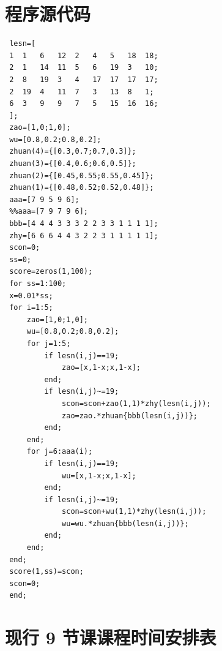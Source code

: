 \documentclass[a4paper]{article}
\def\baselinestretch{1.2}
\begin{document}
\clearpage



\nocite{*}
\clearpage

\begin{appendices}

\section{程序源代码}

 \renewcommand{\baselinestretch}{1}
 \hypertarget{program}{}
 \setlength{\marginparsep}{-470pt}

 \begin{lstlisting}
 lesn=[
 1	1	6	12	2	4	5	18	18;
 2	1	14	11	5	6	19	3	10;
 2	8	19	3	4	17	17	17	17;
 2	19	4	11	7	3	13	8	1;
 6	3	9	9	7	5	15	16	16;
 ];
 zao=[1,0;1,0];
 wu=[0.8,0.2;0.8,0.2];
 zhuan(4)={[0.3,0.7;0.7,0.3]};
 zhuan(3)={[0.4,0.6;0.6,0.5]};
 zhuan(2)={[0.45,0.55;0.55,0.45]};
 zhuan(1)={[0.48,0.52;0.52,0.48]};
 aaa=[7 9 5 9 6];
 %%aaa=[7 9 7 9 6];
 bbb=[4 4 4 3 3 3 2 2 3 3 1 1 1 1];
 zhy=[6 6 6 4 4 3 2 2 3 1 1 1 1 1];
 scon=0;
 ss=0;
 score=zeros(1,100);
 for ss=1:100;
 x=0.01*ss;
 for i=1:5;
     zao=[1,0;1,0];
     wu=[0.8,0.2;0.8,0.2];
     for j=1:5;
         if lesn(i,j)==19;
             zao=[x,1-x;x,1-x];
         end;
         if lesn(i,j)~=19;
             scon=scon+zao(1,1)*zhy(lesn(i,j));
             zao=zao.*zhuan{bbb(lesn(i,j))};
         end;
     end;
     for j=6:aaa(i);
         if lesn(i,j)==19;
             wu=[x,1-x;x,1-x];
         end;
         if lesn(i,j)~=19;
             scon=scon+wu(1,1)*zhy(lesn(i,j));
             wu=wu.*zhuan{bbb(lesn(i,j))};
         end;
     end;
 end;
 score(1,ss)=scon;
 scon=0;
 end;
 \end{lstlisting}

\section{现行 9 节课课程时间安排表}


\end{appendices}
\end{document}
